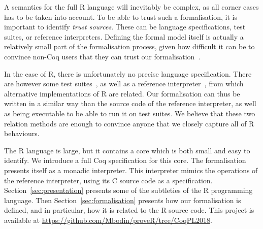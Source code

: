 \documentclass[9pt, sigplan, natbib=false, screen=true]{acmart}
\newcommand\Coq{Coq}
\newcommand\R{R}
\newcommand\Cn{C}
\begin{document}
A semantics for the full \R{} language will inevitably
be complex, as all corner cases has to be taken into account.
%
To be able to trust such a formalisation,
it is important to identify \emph{trust sources}.
These can be language specifications,
test suites,
or reference interpreters.
%
Defining the formal model itself
is actually a relatively small part of the formalisation process,
given how difficult it can be to convince non-\Coq{} users
that they can trust our formalisation~\parencite{leroy2014pip}.




In the case of \R{}, there is unfortunately
no precise language specification.
There are however some test suites~\parencite{2014testr, maj2013testr},
as well as a reference interpreter~\parencite{Rwebsite},
from which alternative implementations of \R{} are related.
%
Our formalisation can thus be written in a similar
way than the source code of the reference interpreter,
as well as being executable to be able to run it on test suites.
We believe that these two relation methods are enough
to convince anyone that we closely capture all of \R{} behaviours.

The \R{} language is large,
but it contains a core which is both small and easy to identify.
We introduce a full \Coq{} specification for this core.
The formalisation presents itself as a monadic interpreter.
This interpreter mimics the operations of the reference interpreter,
using its \Cn{} source code as a specification.
%
Section~\ref{sec:presentation} presents some of the subtleties of the \R{} programming language.
Then Section~\ref{sec:formalisation} presents how our formalisation is defined,
and in particular, how it is related to the \R{} source code.
This project is available at \url{https://github.com/Mbodin/proveR/tree/CoqPL2018}.
\end{document}
